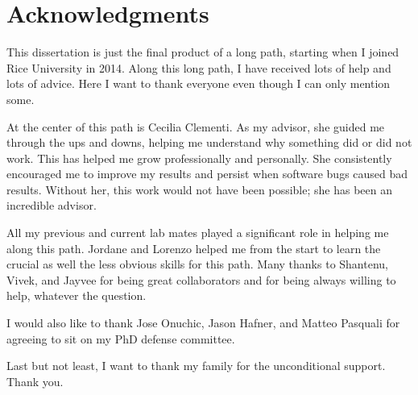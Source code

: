 \chapter*{Acknowledgments}


This dissertation is just the final product of a long path, starting when I joined Rice University in 2014.
Along this long path, I have received lots of help and lots of advice. Here I want to thank everyone even though 
I can only mention some.

At the center of this path is Cecilia Clementi. As my advisor, she guided me through the ups and downs, helping me understand why something did or did not work. This has helped me grow professionally
and personally.
She consistently encouraged me to improve my results and persist when software bugs caused bad results. Without her, this work would not have been possible; she has been an incredible advisor. 

All my previous and current lab mates played a significant role in helping me along this path. Jordane and Lorenzo helped me from the start to learn the crucial as well the less obvious skills for this path. Many thanks to Shantenu, Vivek, and Jayvee for being great collaborators and for being always willing to help, whatever the question.

I would also like to thank Jose Onuchic, Jason Hafner, and Matteo Pasquali for agreeing to sit on my PhD defense committee.

Last but not least, I want to thank my family for the unconditional support. Thank you.
